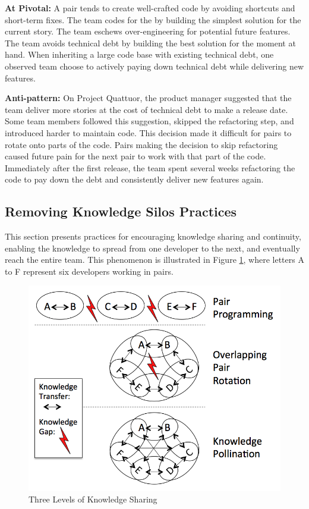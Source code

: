 \textbf{At Pivotal:} A pair tends to create well-crafted code by avoiding shortcuts and short-term fixes. The team codes for the  by building the simplest solution for the current story. The team eschews over-engineering for potential future features. The team avoids technical debt by building the best solution for the moment at hand. When inheriting a large code base with existing technical debt, one observed team choose to actively paying down technical debt while delivering new features. 

\textbf{Anti-pattern:} On Project Quattuor, the product manager suggested that the team deliver more stories at the cost of technical debt to make a release date. Some team members followed this suggestion, skipped the refactoring step, and introduced harder to maintain code. This decision made it difficult for pairs to rotate onto parts of the code. Pairs making the decision to skip refactoring caused future pain for the next pair to work with that part of the code. Immediately after the first release, the team spent several weeks refactoring the code to pay down the debt and consistently deliver new features again.
\subsection{Removing Knowledge Silos Practices}
This section presents practices for encouraging knowledge sharing and continuity, enabling the knowledge to spread from one developer to the next, and eventually reach the entire team. This phenomenon is illustrated in Figure \ref{KnowledgeSharing}, where letters A to F represent six developers working in pairs.

\begin{figure}[t]
\centering
\includegraphics[width=\oneColumnWidth{}]{sustainable_software_development_images/KnowledgeSharingLevels.png}
\caption{Three Levels of Knowledge Sharing}
\label{KnowledgeSharing}
\end{figure}

